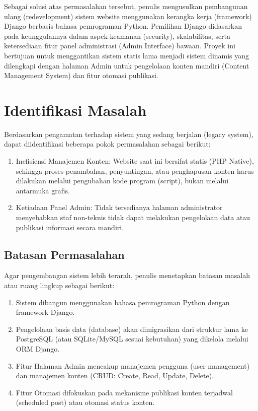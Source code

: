 Sebagai solusi atas permasalahan tersebut, penulis mengusulkan pembangunan ulang (redevelopment) sistem website menggunakan kerangka kerja (framework) Django berbasis bahasa pemrograman Python. Pemilihan Django didasarkan pada keunggulannya dalam aspek keamanan (security), skalabilitas, serta ketersediaan fitur panel administrasi (Admin Interface) bawaan. Proyek ini bertujuan untuk menggantikan sistem statis lama menjadi sistem dinamis yang dilengkapi dengan halaman Admin untuk pengelolaan konten mandiri (Content Management System) dan fitur otomasi publikasi.

\section{Identifikasi Masalah}
Berdasarkan pengamatan terhadap sistem yang sedang berjalan (legacy system), dapat diidentifikasi beberapa pokok permasalahan sebagai berikut:

\begin{enumerate}
    \item Inefisiensi Manajemen Konten: Website saat ini bersifat statis (PHP Native), sehingga proses penambahan, penyuntingan, atau penghapusan konten harus dilakukan melalui pengubahan kode program (script), bukan melalui antarmuka grafis.
    \item Ketiadaan Panel Admin: Tidak tersedianya halaman administrator menyebabkan staf non-teknis tidak dapat melakukan pengelolaan data atau publikasi informasi secara mandiri.
\end{enumerate}

\subsection{Batasan Permasalahan}
Agar pengembangan sistem lebih terarah, penulis menetapkan batasan masalah atau ruang lingkup sebagai berikut:
\begin{enumerate}
    \item Sistem dibangun menggunakan bahasa pemrograman Python dengan framework Django.
    \item Pengelolaan basis data (database) akan dimigrasikan dari struktur lama ke PostgreSQL (atau SQLite/MySQL sesuai kebutuhan) yang dikelola melalui ORM Django.
    \item Fitur Halaman Admin mencakup manajemen pengguna (user management) dan manajemen konten (CRUD: Create, Read, Update, Delete).
    \item Fitur Otomasi difokuskan pada mekanisme publikasi konten terjadwal (scheduled post) atau otomasi status konten.
\end{enumerate}


